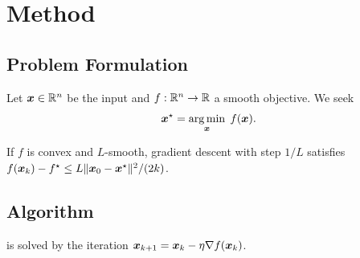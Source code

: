 \section{Method}
\subsection{Problem Formulation}
Let $\bm{x}\in\mathbb{R}^{n}$ be the input and $f:\mathbb{R}^{n}\to\mathbb{R}$ a smooth objective. We seek
\begin{equation}\label{eq:opt}
  \bm{x}^{\star}=\operatorname*{arg\,min}_{\bm{x}}\; f(\bm{x}).
\end{equation}

\begin{theorem}\label{thm:conv}
If $f$ is convex and $L$-smooth, gradient descent with step $1/L$ satisfies
$f(\bm{x}_k)-f^{\star}\le L\lVert\bm{x}_0-\bm{x}^{\star}\rVert^{2}/(2k)$.
\end{theorem}

\subsection{Algorithm}
 is solved by the iteration $\bm{x}_{k+1}=\bm{x}_k-\eta\nabla f(\bm{x}_k)$.

